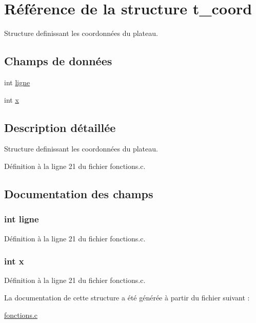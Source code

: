 \hypertarget{structt__coord}{\section{\-Référence de la structure t\-\_\-coord}
\label{structt__coord}
}


\-Structure definissant les coordonnées du plateau.  


\subsection*{\-Champs de données}
\begin{DoxyCompactItemize}
\item 
int \hyperlink{structt__coord_a66af32d3d7b5e0efd6db373c0813e7dd}{ligne}
\item 
int \hyperlink{structt__coord_a6150e0515f7202e2fb518f7206ed97dc}{x}
\end{DoxyCompactItemize}


\subsection{\-Description détaillée}
\-Structure definissant les coordonnées du plateau. 

\-Définition à la ligne 21 du fichier fonctions.\-c.



\subsection{\-Documentation des champs}
\hypertarget{structt__coord_a66af32d3d7b5e0efd6db373c0813e7dd}{
\subsubsection[{ligne}]{\setlength{\rightskip}{0pt plus 5cm}int {\bf ligne}}}\label{structt__coord_a66af32d3d7b5e0efd6db373c0813e7dd}


\-Définition à la ligne 21 du fichier fonctions.\-c.

\hypertarget{structt__coord_a6150e0515f7202e2fb518f7206ed97dc}{
\subsubsection[{x}]{\setlength{\rightskip}{0pt plus 5cm}int {\bf x}}}\label{structt__coord_a6150e0515f7202e2fb518f7206ed97dc}


\-Définition à la ligne 21 du fichier fonctions.\-c.



\-La documentation de cette structure a été générée à partir du fichier suivant \-:\begin{DoxyCompactItemize}
\item 
\hyperlink{fonctions_8c}{fonctions.\-c}\end{DoxyCompactItemize}
